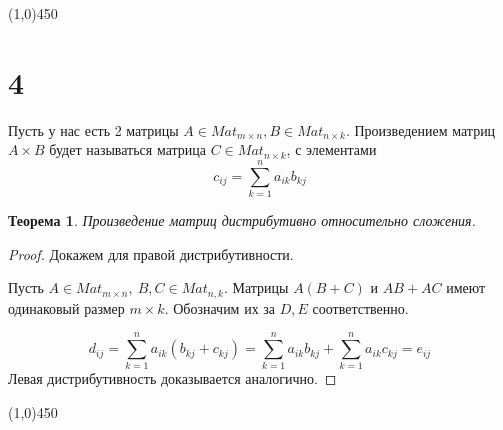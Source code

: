 \documentclass[a4paper,12pt]{article}
\newtheorem*{ther}{Теорема}
\begin{document}
	
	\begin{center}
		\line(1,0){450}
	\end{center}
	
	
	\section*{4}
	Пусть у нас есть 2 матрицы $A \in Mat_{m \times n}, B \in Mat_{n \times k}$. Произведением матриц $A \times B$ будет называться матрица $C \in Mat_{n \times k }$, с элементами \[c_{ij} = \sum_{k = 1}^{n}a_{ik}b_{kj}\]
	\begin{ther}
		Произведение матриц дистрибутивно относительно сложения.
	\end{ther}
	
	\begin{proof}
		Докажем для правой дистрибутивности.
		
		Пусть $A \in Mat_{m \times n}, \ B, C \in Mat_{n, k}$. Матрицы $A(B + C)$ и $AB + AC$ имеют одинаковый размер $m \times k$. Обозначим их за $D, E$ соответственно.
		
		\[
		d_{ij} = \sum_{k =1}^{n} a_{ik}(b_{kj} + c_{kj}) = \sum_{k = 1}^{n} a_{ik}b_{kj} + \sum_{k = 1}^{n} a_{ik}c_{kj} = e_{ij}
		\]
		Левая дистрибутивность доказывается аналогично.
	\end{proof}
	
	
	\begin{center}
		\line(1,0){450}
	\end{center}
	
\end{document}
